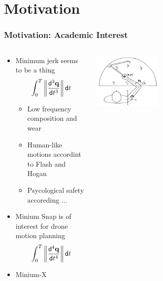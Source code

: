 \section{Motivation}

\begin{frame}[t]
	\frametitle{Motivation: Academic Interest}

	{\fontsize{10}{6}
		\begin{columns}
			\begin{column}{0.5\textwidth}
				\begin{itemize}
					\item Minimum jerk seems to be a thing
					      \begin{equation*}
						      \int_0^T \left\|\frac{\mathsf{d}^{3} \mathbf{q}}{\mathsf{d} t^{3}}\right\| \mathsf{d} t
					      \end{equation*}
					      \begin{itemize}
						      \item Low frequency composition and  wear
						      \item Human-like motions accordint to Flash and Hogan
						      \item Psycological safety accoreding ...
					      \end{itemize}
					\item Minium Snap is of interest for drone motion planning
					      \begin{equation*}
						      \int_0^T \left\|\frac{\mathsf{d}^{4} \mathbf{q}}{\mathsf{d} t^{4}}\right\| \mathsf{d} t
					      \end{equation*}
					\item Minium-X
				\end{itemize}
			\end{column}
			\begin{column}{0.5\textwidth}
				\begin{center}
					\includegraphics[width=0.4\textwidth]{./images/flashAndHoganExperiment.png}
				\end{center}
			\end{column}
		\end{columns}
	}
\end{frame}

